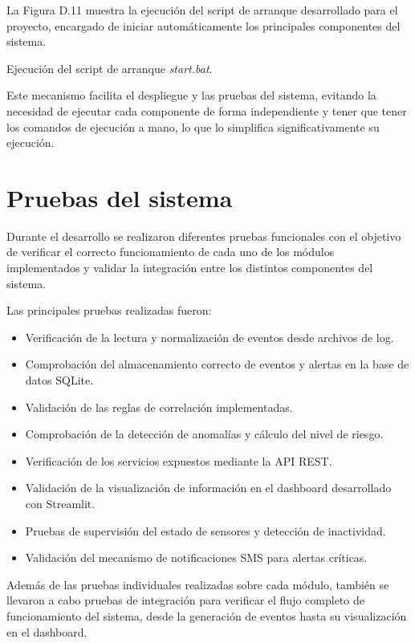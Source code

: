 La Figura D.11 muestra la ejecución del script de arranque desarrollado para el proyecto, encargado de iniciar automáticamente los principales componentes del sistema.

{Ejecución del script de arranque \textit{start.bat}.}

Este mecanismo facilita el despliegue y las pruebas del sistema, evitando la necesidad de ejecutar cada componente de forma independiente y tener que tener los comandos de ejecución a mano, lo que lo simplifica significativamente su ejecución.

\section{Pruebas del sistema}

Durante el desarrollo se realizaron diferentes pruebas funcionales con el objetivo de verificar el correcto funcionamiento de cada uno de los módulos implementados y validar la integración entre los distintos componentes del sistema.

Las principales pruebas realizadas fueron:

\begin{itemize}
	\item Verificación de la lectura y normalización de eventos desde archivos de log.
	\item Comprobación del almacenamiento correcto de eventos y alertas en la base de datos SQLite.
	\item Validación de las reglas de correlación implementadas.
	\item Comprobación de la detección de anomalías y cálculo del nivel de riesgo.
	\item Verificación de los servicios expuestos mediante la API REST.
	\item Validación de la visualización de información en el dashboard desarrollado con Streamlit.
	\item Pruebas de supervisión del estado de sensores y detección de inactividad.
	\item Validación del mecanismo de notificaciones SMS para alertas críticas.
\end{itemize}

Además de las pruebas individuales realizadas sobre cada módulo, también se llevaron a cabo pruebas de integración para verificar el flujo completo de funcionamiento del sistema, desde la generación de eventos hasta su visualización en el dashboard.

